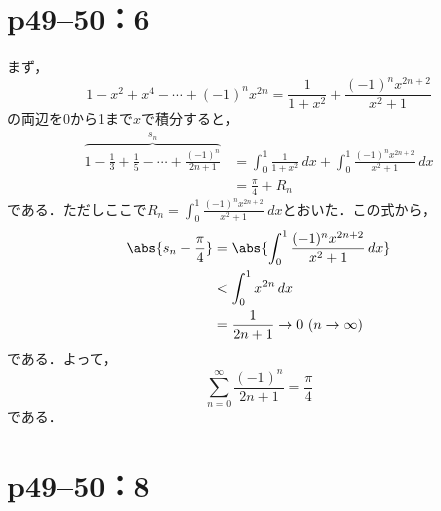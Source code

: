 \documentclass[a4paper,10pt,fleqn]{ltjsarticle}
\begin{document}
\section*{p49--50：6}
\begin{tleftbar}
    まず，
    \[
        1-x^2+x^4-\cdots+(-1)^n x^{2n} =\frac{1}{1+x^2} +\frac{(-1)^n x^{2n+2}}{x^2+1}
    \]
    の両辺を0から1まで$x$で積分すると，
    \begin{align*}
        \overbrace{1-\frac{1}{3}+\frac{1}{5}-\cdots+\frac{(-1)^n}{2n+1}}^{s_n} & =\int_{0}^{1} \frac{1}{1+x^2} \, dx +\int_{0}^{1}\frac{(-1)^n x^{2n+2}}{x^2+1}  \, dx \\
                                                                               & = \frac{\pi}{4} + R_n
    \end{align*}
    である．ただしここで$R_n =\int_{0}^{1}\frac{(-1)^n x^{2n+2}}{x^2+1} \, dx$とおいた．この式から，
    \begin{align*}
        \abs{s_n -\frac{\pi}{4}  } & = \abs{\int_{0}^{1}\frac{(-1)^n x^{2n+2}}{x^2+1} \, dx } \\
                                   & < \int_{0}^{1} x^{2n} \, dx                              \\
                                   & =\frac{1}{2n+1} \to 0 ~(n \to \infty)
    \end{align*}
    である．よって，
    \[
        \sum_{n=0}^{\infty} \frac{(-1)^n}{2n+1} =\frac{\pi}{4}
    \]
    である．
\end{tleftbar}

\newpage

\section*{p49--50：8}
\end{document}

